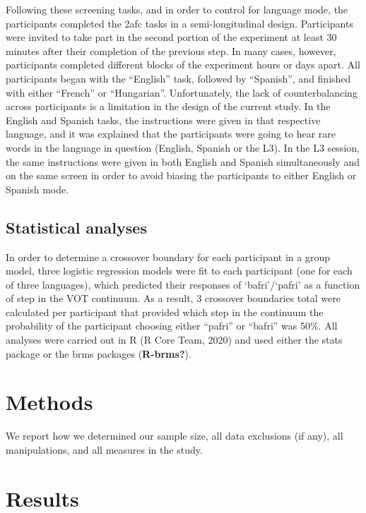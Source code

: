 \documentclass[
  man,floatsintext]{apa6}
\begin{document}
Following these screening tasks, and in order to control for language mode, the participants completed the 2afc tasks in a semi-longitudinal design.
Participants were invited to take part in the second portion of the experiment at least 30 minutes after their completion of the previous step. In many cases, however, participants completed different blocks of the experiment hours or days apart.
All participants began with the ``English'' task, followed by ``Spanish'', and finished with either ``French'' or ``Hungarian''. Unfortunately, the lack of counterbalancing across participants is a limitation in the design of the current study.
In the English and Spanish tasks, the instructions were given in that respective language, and it was explained that the participants were going to hear rare words in the language in question (English, Spanish or the L3).
In the L3 session, the same instructions were given in both English and Spanish simultaneously and on the same screen in order to avoid biasing the participants to either English or Spanish mode.

\hypertarget{statistical-analyses}{%
\subsection{Statistical analyses}\label{statistical-analyses}}

In order to determine a crossover boundary for each participant in a group model, three logistic regression models were fit to each participant (one for each of three languages), which predicted their responses of `bafri'/`pafri' as a function of step in the VOT continuum.
As a result, 3 crossover boundaries total were calculated per participant that provided which step in the continuum the probability of the participant choosing either ``pafri'' or ``bafri'' was 50\%.
All analyses were carried out in R (R Core Team, 2020) and used either the stats package or the brms packages (\textbf{R-brms?}).

\hypertarget{methods-1}{%
\section{Methods}\label{methods-1}}

We report how we determined our sample size, all data exclusions (if any), all manipulations, and all measures in the study.

\hypertarget{results}{%
\section{Results}\label{results}}
\end{document}
